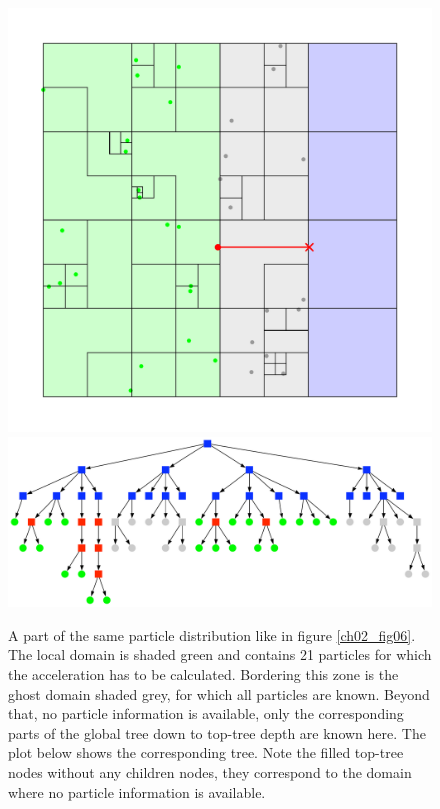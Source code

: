\begin{figure}[htbp]
\begin{center}
\includegraphics[scale=0.6]{07quadtree50_xy_TPL2.pdf}
\includegraphics[scale=0.3]{07quadtree50_TPL2_stage3.pdf}
\caption{A part of the same particle distribution like in figure \ref{ch02_fig06}. The local domain is shaded green and contains 21 particles for which the acceleration has to be calculated. Bordering this zone is the ghost domain shaded grey, for which all particles are known. Beyond that, no particle information is available, only the corresponding parts of the global tree down to top-tree depth are known here. The plot below shows the corresponding tree. Note the filled top-tree nodes without any children nodes, they correspond to the domain where no particle information is available.}
\label{ch02_fig07}
\end{center}
\end{figure}

